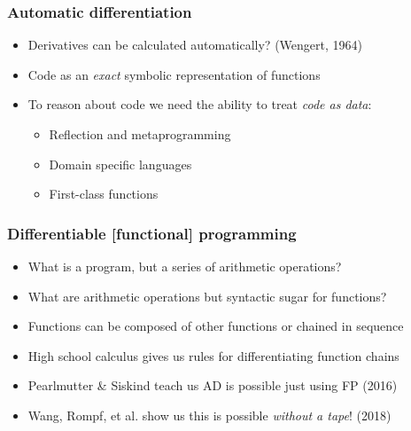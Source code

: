 \documentclass{beamer}
\begin{document}
    \begin{frame}
        \frametitle{Automatic differentiation}
        \begin{itemize}
            \item Derivatives can be calculated automatically? (Wengert, 1964)
            \item Code as an \textit{exact} symbolic representation of functions
            \item To reason about code we need the ability to treat \textit{code as data}:
            \begin{itemize}
                \item Reflection and metaprogramming
                \item Domain specific languages
                \item First-class functions
            \end{itemize}
        \end{itemize}
    \end{frame}


    \begin{frame}
        \frametitle{Differentiable [functional] programming}
        \begin{itemize}
            \item What is a program, but a series of arithmetic operations?
            \item What are arithmetic operations but syntactic sugar for functions?
            \item Functions can be composed of other functions or chained in sequence
            \item High school calculus gives us rules for differentiating function chains
            \item Pearlmutter \& Siskind teach us AD is possible just using FP (2016)
            \item Wang, Rompf, et al. show us this is possible \textit{without a tape}! (2018)
        \end{itemize}
    \end{frame}

\end{document}
